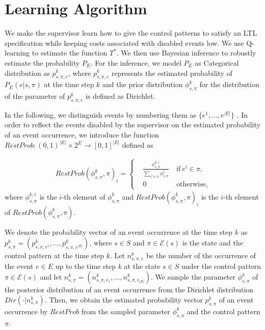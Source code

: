 \documentclass[10 pt, dvipdfmx]{article}
\theoremstyle{definition}
\begin{document}
\section{Learning Algorithm}
We make the supervisor learn how to give the control patterns to satisfy an LTL specification while keeping costs associated with disabled events low. We use Q-learning to estimate the function $T^{\ast}$. We then use Bayesian inference to robustly estimate the probability $P_E$. For the inference, we model $P_E$ as Categorical distribution as $p^k_{s,\pi,e}$, where $p^k_{s,\pi,e}$ represents the estimated probability of $P_E(e|s,\pi)$ at the time step $k$ and the prior distribution $\phi^k_{s,\pi}$ for the distribution of the parameter of $p^k_{s,\pi,e}$ is defined as Dirichlet.

In the following, we distinguish events by numbering them as $\{ e^1, \ldots, e^{|E|} \}$ . In order to reflect the events disabled by the supervisor on the estimated probability of an event occurrence, we introduce the function $RestProb : (0,1)^{|E|} \times 2^E \rightarrow [0,1]^{|E|}$ defined as

\begin{align}
  RestProb(\phi^k_{s,\pi},\pi)_i =
  \left\{
  \begin{aligned}
    & \frac{\phi^{k,i}_{s,\pi}}{\sum_{e^j \in \pi} \phi^j_{s,\pi}} \  &\text{if}\ e^i \in \pi,\\
    &0   \ &\text{otherwise},
  \end{aligned}
  \right.
\end{align}
where $\phi^{k,i}_{s,\pi}$ is the $i$-th element of $\phi^k_{s,\pi}$ and $RestProb(\phi^k_{s,\pi},\pi)_i$ is the $i$-th element of $RestProb(\phi^k_{s,\pi},\pi)$.

We denote the probability vector of an event occurrence at the time step $k$ as $p^k_{s,\pi} = (p^k_{s,\pi,e^1}, \ldots, p^k_{s,\pi,e^{|E|}})$, where $s \in S$ and $\pi \in \mathcal{E}(s)$ is the state and the control pattern at the time step $k$. Let $n^k_{s,\pi,e}$ be the number of the occurrence of the event $e \in E$ up to the time step $k$ at the state $s \in S$ under the control pattern $\pi \in \mathcal{E}(s)$ and let $n^k_{s,\pi} = (n^k_{s,\pi,e_1}, \ldots, n^k_{s,\pi,e_{|E|}})$.
We sample the parameter $\phi^k_{s,\pi}$ of the posterior distribution of an event occurrence from the Dirichlet distribution $Dir(\cdot|n^k_{s,\pi})$. Then, we obtain the estimated probability vector $p^k_{s,\pi}$ of an event occurrence by $RestProb$ from the sampled parameter $\phi^k_{s,\pi}$ and the control pattern $\pi$.
\end{document}
